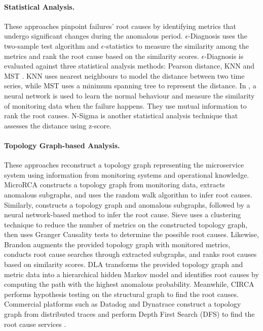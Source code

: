 \paragraph{Statistical Analysis.} These approaches pinpoint failures' root causes by identifying metrics that undergo significant changes during the anomalous period. $\epsilon$-Diagnosis \cite{Shan2019Ediagnosis} uses the two-sample test algorithm and $\epsilon$-statistics to measure the similarity among the metrics and rank the root cause based on the similarity scores. $\epsilon$-Diagnosis is evaluated against three statistical analysis methods: Pearson distance, KNN \cite{friedman1983graph, luo2014correlating} and MST \cite{friedman1979multivariate}. KNN \cite{friedman1983graph, luo2014correlating} uses nearest neighbours to model the distance between two time series, while MST \cite{friedman1979multivariate} uses a minimum spanning tree to represent the distance. In \cite{wang2020root}, a neural network is used to learn the normal behaviour and measure the similarity of monitoring data when the failure happens. They use mutual information to rank the root causes. N-Sigma \cite{Jinjin2018Microscope,Li2022Circa} is another statistical analysis technique that assesses the distance using z-score.

\vspace{-0.2cm}
\paragraph{Topology Graph-based Analysis.} These approaches reconstruct a topology graph representing the microservice system using information from monitoring systems and operational knowledge. MicroRCA \cite{wu2020microrca} constructs a topology graph from monitoring data, extracts anomalous subgraphs, and uses the random walk algorithm to infer root causes. Similarly, \cite{wu2020performance} constructs a topology graph and anomalous subgraphs, followed by a neural network-based method to infer the root cause. Sieve \cite{thalheim2017sieve} uses a clustering technique to reduce the number of metrics on the constructed topology graph, then uses Granger Causality tests \cite{Granger1980causal} to determine the possible root causes. Likewise, Brandon \cite{brandon2020graph} augments the provided topology graph with monitored metrics, conducts root cause searches through extracted subgraphs, and ranks root causes based on similarity scores. DLA \cite{samir2019dla} transforms the provided topology graph and metric data into a hierarchical hidden Markov model and identifies root causes by computing the path with the highest anomalous probability. Meanwhile, CIRCA \cite{Li2022Circa} performs hypothesis testing on the structural graph to find the root causes. Commercial platforms such as Datadog \cite{datadog} and Dynatrace \cite{dynatrace} construct a topology graph from distributed traces and perform Depth First Search (DFS) to find the root cause services \cite{datadog1, dynatrace3}.

